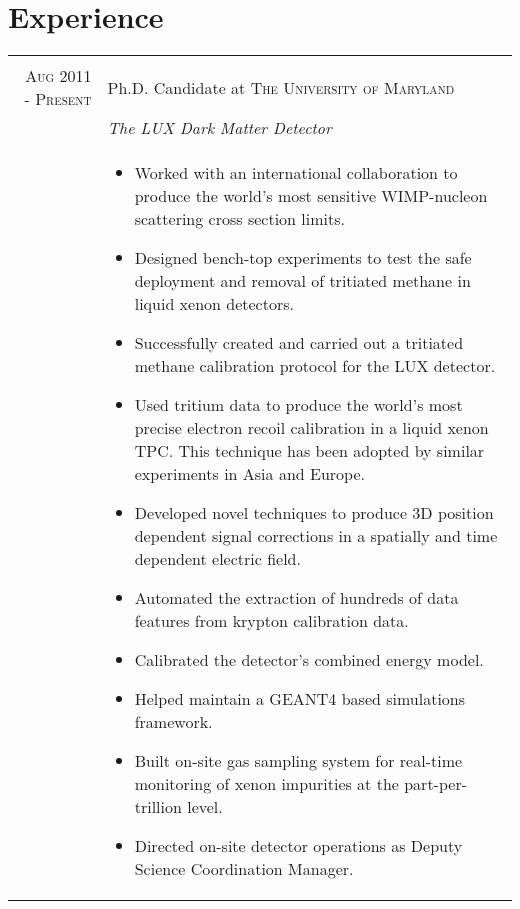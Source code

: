 \documentclass[a4paper,10pt]{article}
\begin{document}
\section{Experience}
\begin{tabular}{r|p{11cm}}
 \multicolumn{2}{c}{} \\
 \textsc{Aug 2011 - Present} & Ph.D. Candidate at \textsc{The University of Maryland} \\&\emph{The LUX Dark Matter Detector}\\&\footnotesize{
 \begin{itemize}
 
 \item Worked with an international collaboration to produce the world's most sensitive WIMP-nucleon scattering cross section limits.  
 
\item Designed bench-top experiments to test the safe deployment and removal of tritiated methane in liquid xenon detectors.  

\item Successfully created and carried out a tritiated methane calibration protocol for the LUX detector.  

\item Used tritium data to produce the world's most precise electron recoil calibration in a liquid xenon TPC.  This technique has been adopted by similar experiments in Asia and Europe. 

\item Developed novel techniques to produce 3D position dependent signal corrections in a spatially and time dependent electric field.  

\item Automated the extraction of hundreds of data features from krypton calibration data.  

\item Calibrated the detector's combined energy model.

\item Helped maintain a GEANT4 based simulations framework.

\item Built on-site gas sampling system for real-time monitoring of xenon impurities at the part-per-trillion level.

\item Directed on-site detector operations as Deputy Science Coordination Manager.
\end{itemize}
}\\ 


\end{tabular}
\end{document}
